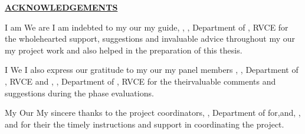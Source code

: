 \thispagestyle{empty}
\ifIDP \vspace{-1cm}\fi
\begin{center}
	\Large\textbf{\underline{ACKNOWLEDGEMENTS}} \par
\end{center}

\ifPG I am \else
\ifStuNameBUsed We are \else I am \fi\fi indebted to \ifPG my \else\ifStuNameBUsed our \else my \fi\fi guide, \textbf{\printGuideNameA}, \printGuideDesigA, Department of \printGuideDeptAInSF, RVCE for the wholehearted support, suggestions and invaluable advice throughout \ifPG my \else\ifStuNameBUsed our \else my \fi\fi project work and also helped in the preparation of this thesis.\\ \par

\ifPG I \else \ifStuNameBUsed We \else I \fi\fi also express our gratitude to \ifPG my \else\ifStuNameBUsed our \else my \fi\fi  panel member\ifIDP\space\else s \fi\textbf{\printPanelMemberA}, \printPanelMemberDesigA, Department of \printPanelMemberDeptAInSF, RVCE \ifIDP \else and \textbf{\printPanelMemberB}, \printPanelMemberDesigB , Department of \printPanelMemberDeptBInSF, RVCE \fi for \ifPanelMemBUsed the \else their\fi valuable comments and suggestions during the phase evaluations. \\ \par

\ifPG My \else \ifStuNameBUsed Our \else My \fi\fi sincere thanks to the project coordinator\ifIDP\else\ifProjectMemBUsed s\fi\fi\space \textbf{\printProjectMemberA}, \printProjectMemberDesigA, Department of \printProjectMemberDeptAInSF \ifIDP \space for\space \else\ifProjectMemBUsed \ifProjectMemCUsed,\space \else\space and\space \fi\textbf{\printProjectMemberB}, \printProjectMemberDesigB,  \ifProjectMemCUsed\space and \textbf{\printProjectMemberC} \fi\fi\space for \ifProjectMemBUsed their \else the \fi\fi timely instructions and support in coordinating the project.\\ \par

